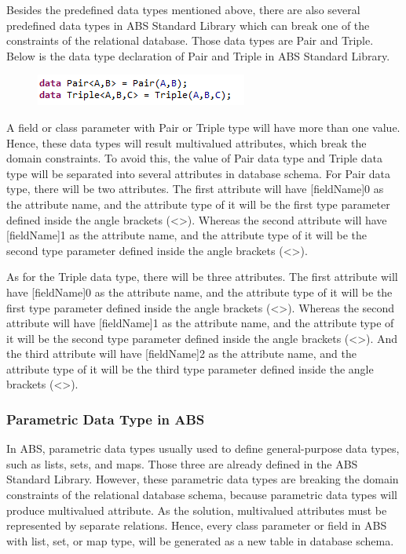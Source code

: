 \documentclass[runningheads,a4paper]{llncs}
\begin{document}
Besides the predefined data types mentioned above, there are also several predefined data types in ABS Standard Library which can break one of the constraints of the relational database. Those data types are Pair and Triple. Below is the data type declaration of Pair and Triple in ABS Standard Library.

\begin{figure}
	\centering
	\includegraphics[scale=0.7]{PAIR.png}
	\label{primary key}
\end{figure}

A field or class parameter with Pair or Triple type will have more than one value. Hence, these data types will result multivalued attributes, which break the domain constraints. To avoid this, the value of Pair data type and Triple data type will be separated into several attributes in database schema. For Pair data type, there will be two attributes. The first attribute will have [fieldName]0 as the attribute name, and the attribute type of it will be the first type parameter defined inside the angle brackets (\textless \textgreater). Whereas the second attribute will have [fieldName]1 as the attribute name, and the attribute type of it will be the second type parameter defined inside the angle brackets (\textless \textgreater).

As for the Triple data type, there will be three attributes. The first attribute will have [fieldName]0 as the attribute name, and the attribute type of it will be the first type parameter defined inside the angle brackets (\textless \textgreater). Whereas the second attribute will have [fieldName]1 as the attribute name, and the attribute type of it will be the second type parameter defined inside the angle brackets (\textless \textgreater). And the third attribute will have [fieldName]2 as the attribute name, and the attribute type of it will be the third type parameter defined inside the angle brackets (\textless \textgreater). 

\subsubsection{Parametric Data Type in ABS}
In ABS, parametric data types usually used to define general-purpose data types, such as lists, sets, and maps. Those three are already defined in the ABS Standard Library. However, these parametric data types are breaking the domain constraints of the relational database schema, because parametric data types will produce multivalued attribute. As the solution, multivalued attributes must be represented by separate relations. Hence, every class parameter or field in ABS with list, set, or map type, will be generated as a new table in database schema.
\end{document}
